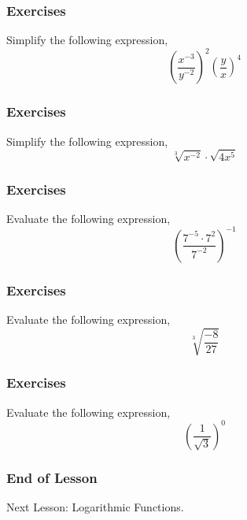 \documentclass[xcolor=dvipsnames]{beamer}
\begin{document}
\begin{frame}
  \frametitle{Exercises}
  {\ubung} Simplify the following expression,
\begin{equation}
  \label{eq:eajaekei}
  \left(\frac{x^{-3}}{y^{-2}}\right)^{2}\left(\frac{y}{x}\right)^{4}
\end{equation}
\end{frame}

\begin{frame}
  \frametitle{Exercises}
  {\ubung} Simplify the following expression,
\begin{equation}
  \label{eq:ohchoewi}
  \sqrt[3]{x^{-2}}\cdot\sqrt{4x^{5}}
\end{equation}
\end{frame}

\begin{frame}
  \frametitle{Exercises}
  {\ubung} Evaluate the following expression,
\begin{equation}
  \label{eq:ohzeiphi}
  \left(\frac{7^{-5}\cdot{}7^{2}}{7^{-2}}\right)^{-1}
\end{equation}
\end{frame}

\begin{frame}
  \frametitle{Exercises}
  {\ubung} Evaluate the following expression,
\begin{equation}
  \label{eq:puareipo}
  \sqrt[3]{\frac{-8}{27}}
\end{equation}
\end{frame}

\begin{frame}
  \frametitle{Exercises}
  {\ubung} Evaluate the following expression,
\begin{equation}
  \label{eq:eteequod}
  \left(\frac{1}{\sqrt{3}}\right)^{0}
\end{equation}
\end{frame}

\begin{frame}
  \frametitle{End of Lesson}
Next Lesson: Logarithmic Functions.
\end{frame}
\end{document}
